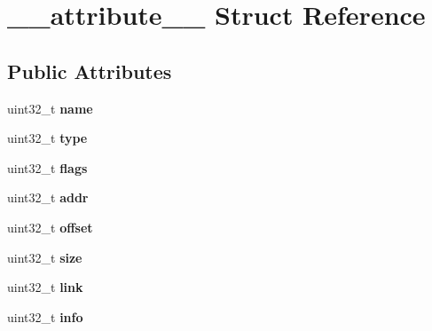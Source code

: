 \hypertarget{struct____attribute____}{}\section{\+\_\+\+\_\+attribute\+\_\+\+\_\+ Struct Reference}
\label{struct____attribute____}
\subsection*{Public Attributes}
\begin{DoxyCompactItemize}
\item 
\mbox{\label{struct____attribute_____ac3db03805315a061ca04cb48895462f4}} 
uint32\+\_\+t {\bfseries name}
\item 
\mbox{\label{struct____attribute_____a3ee5069a110bbbcea3b58104bc611a7e}} 
uint32\+\_\+t {\bfseries type}
\item 
\mbox{\label{struct____attribute_____a0e55029d7a88d0463836e1827d4027f4}} 
uint32\+\_\+t {\bfseries flags}
\item 
\mbox{\label{struct____attribute_____a4ce6acf78e1c238f7189b8dd3dfeb323}} 
uint32\+\_\+t {\bfseries addr}
\item 
\mbox{\label{struct____attribute_____a9f9e12128c831f248b75b8fe39b8d5d6}} 
uint32\+\_\+t {\bfseries offset}
\item 
\mbox{\label{struct____attribute_____a04032b2782f3c2f600024b42bf2478f4}} 
uint32\+\_\+t {\bfseries size}
\item 
\mbox{\label{struct____attribute_____af3ad2823a89e4a028e95f297326348bc}} 
uint32\+\_\+t {\bfseries link}
\item 
\mbox{\label{struct____attribute_____a68d7b10f60f896b896e152bb1c52eafe}} 
uint32\+\_\+t {\bfseries info}
\item 
\mbox{\label{struct____attribute_____a2b9ae09ad242f6352359c1ee5ab1305e}} 

\end{DoxyCompactItemize}
